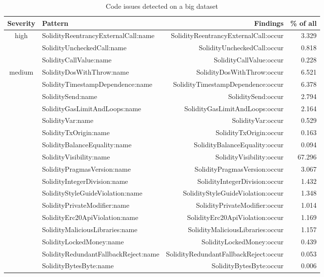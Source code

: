 \let\letcs\texapiletcs
\begin{table}[t]
	\centering
	\caption{Code issues detected on a big dataset}
	\begin{tabular}{|c|l|r|r|}
		\hline
		\textbf{Severity} & \textbf{Pattern} & \textbf{Findings} & \textbf{\% of all} \\
		\hline
		\multirow{3}{*}{high} & {\usevalue SolidityReentrancyExternalCall:name } & {\usevalue SolidityReentrancyExternalCall:occur } & 3.329 \\
		 & {\usevalue SolidityUncheckedCall:name } & {\usevalue SolidityUncheckedCall:occur } & 0.818 \\
		 & {\usevalue SolidityCallValue:name } & {\usevalue SolidityCallValue:occur } & 0.228 \\
		\hline
		\multirow{8}{*}{medium} & {\usevalue SolidityDosWithThrow:name } & {\usevalue SolidityDosWithThrow:occur } & 6.521 \\
		& {\usevalue SolidityTimestampDependence:name } & {\usevalue SolidityTimestampDependence:occur } & 6.378 \\
		& {\usevalue SoliditySend:name } & {\usevalue SoliditySend:occur } & 2.794 \\
		& {\usevalue SolidityGasLimitAndLoops:name } & {\usevalue SolidityGasLimitAndLoops:occur } & 2.164 \\
		& {\usevalue SolidityVar:name } & {\usevalue SolidityVar:occur } & 0.529 \\
		& {\usevalue SolidityTxOrigin:name } & {\usevalue SolidityTxOrigin:occur } & 0.163 \\
		& {\usevalue SolidityBalanceEquality:name } & {\usevalue SolidityBalanceEquality:occur } & 0.094 \\
		\hline
		\multirow{10}{*}{low} & {\usevalue SolidityVisibility:name } & {\usevalue SolidityVisibility:occur } & 67.296 \\& {\usevalue SolidityPragmasVersion:name } & {\usevalue SolidityPragmasVersion:occur } & 3.067 \\
		& {\usevalue SolidityIntegerDivision:name } & {\usevalue SolidityIntegerDivision:occur } & 1.432 \\
		& {\usevalue SolidityStyleGuideViolation:name } & {\usevalue SolidityStyleGuideViolation:occur } & 1.348 \\
		& {\usevalue SolidityPrivateModifier:name } & {\usevalue SolidityPrivateModifier:occur } & 1.014 \\
		& {\usevalue SolidityErc20ApiViolation:name } & {\usevalue SolidityErc20ApiViolation:occur } & 1.169 \\
		& {\usevalue SolidityMaliciousLibraries:name } & {\usevalue SolidityMaliciousLibraries:occur } & 1.157 \\
		& {\usevalue SolidityLockedMoney:name } & {\usevalue SolidityLockedMoney:occur } & 0.439 \\
		& {\usevalue SolidityRedundantFallbackReject:name } & {\usevalue SolidityRedundantFallbackReject:occur } & 0.053 \\
		& {\usevalue SolidityBytesByte:name } & {\usevalue SolidityBytesByte:occur } & 0.006 \\
		\hline
	\end{tabular}
	\label{MassiveTestingTable}
\end{table}
\let\letcs\etoolboxletcs
